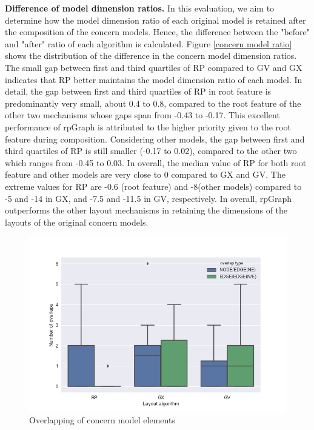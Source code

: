 \textbf{Difference of model dimension ratios.}  In this evaluation, we aim to determine how the model dimension ratio of each original model is retained after the composition of the concern models. Hence, the difference between the "before" and "after"  ratio of each algorithm is calculated. Figure \ref{concern model ratio} shows the distribution of the difference in the concern model dimension ratios. The small gap between first and third quartiles of RP compared to GV and GX indicates that RP better maintains the model dimension ratio of each model. In detail, the gap between first and third quartiles of RP in root feature is predominantly very small, about 0.4 to 0.8, compared to the root feature of the other two mechanisms whose gaps span from -0.43 to -0.17. This excellent performance of rpGraph is attributed to the higher priority given to the root feature during composition. Considering other models, the gap between first and third quartiles of RP is still smaller (-0.17 to 0.02), compared to the other two which ranges from -0.45 to 0.03. In overall, the median value of RP for both root feature and other models are very close to 0 compared to GX and GV.  The extreme values for RP are -0.6 (root feature) and -8(other models) compared to -5 and -14 in GX, and -7.5 and -11.5 in GV, respectively. In overall, rpGraph outperforms the other layout mechanisms in retaining the dimensions of the layouts of the original concern models.

\begin{figure}
\includegraphics[width=0.9\linewidth]{Evaluation/overlap_Concern.png}
	\caption{Overlapping of concern model elements}
	\label{concern overlap}
\end{figure}

